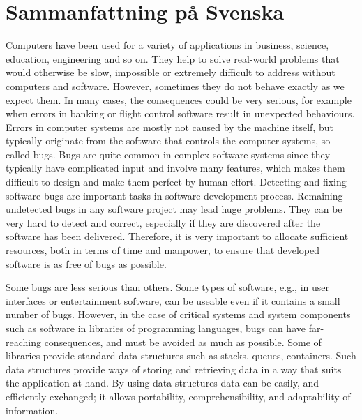 \chapter*{Sammanfattning på Svenska \texorpdfstring{\hfill{}}{}}

Computers have been used for a variety of applications in business, science, education, engineering and so on. They help to solve real-world problems that would otherwise be slow, impossible or extremely difficult to address without computers and software. However, sometimes they do not behave exactly as we expect them. In many cases, the consequences could be very serious, for example when errors in banking or flight control software result in unexpected behaviours. Errors in computer systems are mostly not caused by the machine itself, but typically originate from the software that controls the computer systems, so-called bugs. Bugs are quite common in complex software systems since they typically have complicated input and involve many features, which makes them difficult to design and make them perfect by human effort. Detecting and fixing software bugs are important tasks in software development process. Remaining undetected bugs in any software project may lead huge problems. They can be very hard to detect and correct, especially if they are discovered after the software has been delivered. Therefore, it is very important to allocate sufficient resources, both in terms of time and manpower, to ensure that developed software is as free of bugs as possible. 

Some bugs are less serious than others. Some types of software, e.g., in user interfaces or entertainment software, can be useable even if it contains a small number of bugs.
However, in the case of critical systems and system components such as software in libraries of programming languages, 
bugs can have far-reaching consequences, and must be avoided as much as possible.
Some of libraries provide standard data structures such as stacks, queues, containers. Such data structures provide ways of storing  
and retrieving data in a way that suits the application at hand.
By using data structures data can be easily, and efficiently exchanged; it allows portability, comprehensibility, and adaptability of information.

